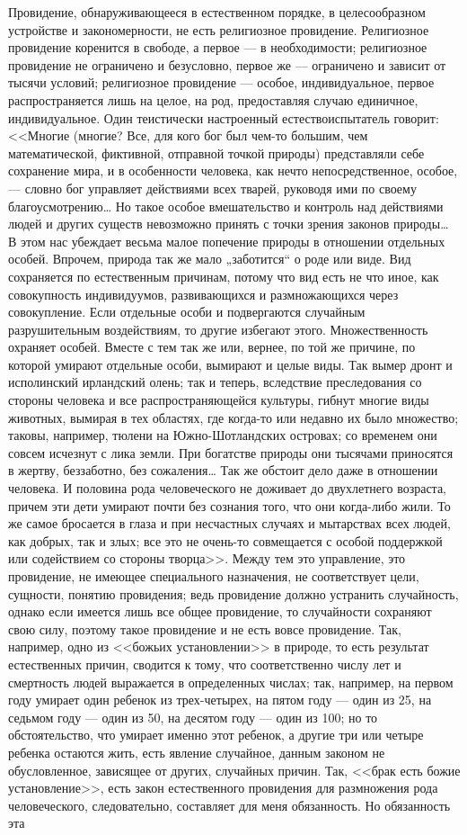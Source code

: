 \documentclass[12pt]{article}
\begin{document}
Провидение, обнаруживающееся в естественном порядке, в целесообразном устройстве и закономерности, не есть религиозное провидение. Религиозное провидение коренится в свободе, а первое --- в необходимости; религиозное провидение не ограничено и безусловно, первое же --- ограничено и зависит от тысячи условий; религиозное провидение --- особое, индивидуальное, первое распространяется лишь на целое, на род, предоставляя случаю единичное, индивидуальное. Один теистически настроенный естествоиспытатель говорит: <<Многие (многие? Все, для кого бог был чем-то большим, чем математической, фиктивной, отправной точкой природы) представляли себе сохранение мира, и в особенности человека, как нечто непосредственное, особое,--- словно бог управляет действиями всех тварей, руководя ими по своему благоусмотрению… Но такое особое вмешательство и контроль над действиями людей и других существ невозможно принять с точки зрения законов природы… В этом нас убеждает весьма малое попечение природы в отношении отдельных особей. Впрочем, природа так же мало „заботится“ о роде или виде. Вид сохраняется по естественным причинам, потому что вид есть не что иное, как совокупность индивидуумов, развивающихся и размножающихся через совокупление. Если отдельные особи и подвергаются случайным разрушительным воздействиям, то другие избегают этого. Множественность охраняет особей. Вместе с тем так же или, вернее, по той же причине, по которой умирают отдельные особи, вымирают и целые виды. Так вымер дронт и исполинский ирландский олень; так и теперь, вследствие преследования со стороны человека и все распространяющейся культуры, гибнут многие виды животных, вымирая в тех областях, где когда-то или недавно их было множество; таковы, например, тюлени на Южно-Шотландских островах; со временем они совсем исчезнут с лика земли. При богатстве природы они тысячами приносятся в жертву, беззаботно, без сожаления… Так же обстоит дело даже в отношении человека. И половина рода человеческого не доживает до двухлетнего возраста, причем эти дети умирают почти без сознания того, что они когда-либо жили. То же самое бросается в глаза и при несчастных случаях и мытарствах всех людей, как добрых, так и злых; все это не очень-то совмещается с особой поддержкой или содействием со стороны творца>>. Между тем это управление, это провидение, не имеющее специального назначения, не соответствует цели, сущности, понятию провидения; ведь провидение должно устранить случайность, однако если имеется лишь все общее провидение, то случайности сохраняют свою силу, поэтому такое провидение и не есть вовсе провидение. Так, например, одно из <<божьих установлении>> в природе, то есть результат естественных причин, сводится к тому, что соответственно числу лет и смертность людей выражается в определенных числах; так, например, на первом году умирает один ребенок из трех-четырех, на пятом году --- один из 25, на седьмом году --- один из 50, на десятом году --- один из 100; но то обстоятельство, что умирает именно этот ребенок, а другие три или четыре ребенка остаются жить, есть явление случайное, данным законом не обусловленное, зависящее от других, случайных причин. Так, <<брак есть божие установление>>, есть закон естественного провидения для размножения рода человеческого, следовательно, составляет для меня обязанность. Но обязанность эта 
\end{document}
